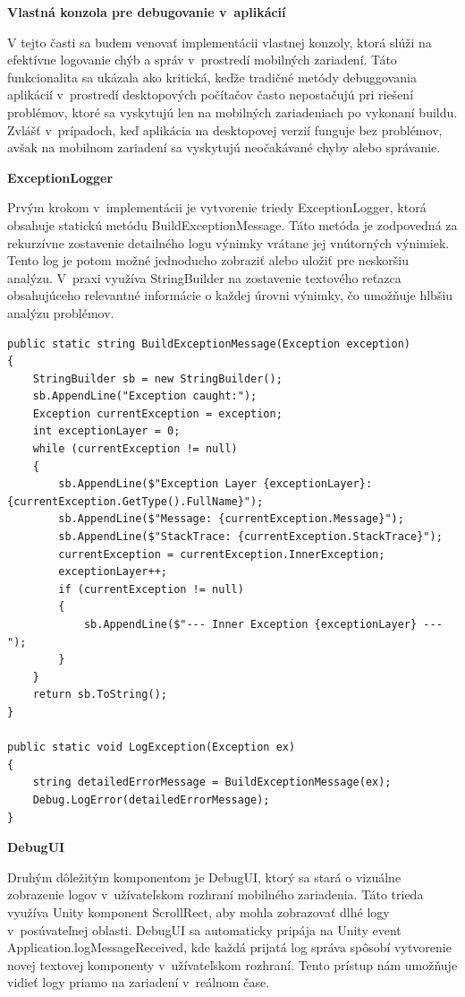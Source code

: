 {\large\textbf{Vlastná konzola pre debugovanie v~aplikácií}}

V tejto časti sa budem venovať implementácii vlastnej konzoly, ktorá slúži na efektívne logovanie chýb a správ v~prostredí mobilných zariadení. Táto funkcionalita sa ukázala ako kritická, keďže tradičné metódy debuggovania aplikácií v~prostredí desktopových počítačov často nepostačujú pri riešení problémov, ktoré sa vyskytujú len na mobilných zariadeniach po vykonaní buildu. Zvlášť v~prípadoch, keď aplikácia na desktopovej verzií funguje bez problémov, avšak na mobilnom zariadení sa vyskytujú neočakávané chyby alebo správanie.

{\normalsize\textbf{ExceptionLogger}}

Prvým krokom v~implementácii je vytvorenie triedy ExceptionLogger, ktorá obsahuje statickú metódu BuildExceptionMessage. Táto metóda je zodpovedná za rekurzívne zostavenie detailného logu výnimky vrátane jej vnútorných výnimiek. Tento log je potom možné jednoducho zobraziť alebo uložiť pre neskoršiu analýzu. V~praxi využíva StringBuilder na zostavenie textového reťazca obsahujúceho relevantné informácie o každej úrovni výnimky, čo umožňuje hlbšiu analýzu problémov.

\lstset{style=Csharp}
\begin{lstlisting}[caption={ExceptionLogger Class - Vytvorenie custom debug správy}, label=exceptionLogger]
public static string BuildExceptionMessage(Exception exception)
{
    StringBuilder sb = new StringBuilder();
    sb.AppendLine("Exception caught:");
    Exception currentException = exception;
    int exceptionLayer = 0; 
    while (currentException != null)
    {
        sb.AppendLine($"Exception Layer {exceptionLayer}: {currentException.GetType().FullName}");
        sb.AppendLine($"Message: {currentException.Message}");
        sb.AppendLine($"StackTrace: {currentException.StackTrace}");
        currentException = currentException.InnerException;
        exceptionLayer++;
        if (currentException != null)
        {
            sb.AppendLine($"--- Inner Exception {exceptionLayer} ---");
        }
    }
    return sb.ToString();
}

public static void LogException(Exception ex)
{
    string detailedErrorMessage = BuildExceptionMessage(ex);
    Debug.LogError(detailedErrorMessage);
}
\end{lstlisting} 

{\normalsize\textbf{DebugUI}}

Druhým dôležitým komponentom je DebugUI, ktorý sa stará o vizuálne zobrazenie logov v~užívateľskom rozhraní mobilného zariadenia. Táto trieda využíva Unity komponent ScrollRect, aby mohla zobrazovať dlhé logy v~posúvateľnej oblasti. DebugUI sa automaticky pripája na Unity event Application.logMessageReceived, kde každá prijatá log správa spôsobí vytvorenie novej textovej komponenty v~užívateľskom rozhraní. Tento prístup nám umožňuje vidieť logy priamo na zariadení v~reálnom čase.


